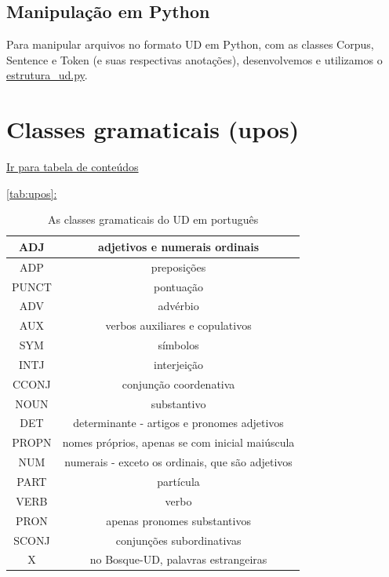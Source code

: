 \documentclass[output=paper,colorlinks,citecolor=brown]{langscibook}
\newcommand*{\fullref}[1]{\hyperref[{#1}]{\autoref*{#1}: \nameref*{#1}}} %
\begin{document}
\section{Manipulação em Python}\label{sec:python}



Para manipular arquivos no formato UD em Python, com as classes Corpus, Sentence e Token (e suas respectivas anotações), desenvolvemos e utilizamos o \href{https://github.com/alvelvis/ACDC-UD/blob/master/estrutura_ud.py}{estrutura\_ud.py}.

\chapter{Classes gramaticais (upos)}\label{sec:upos}

\hyperlink{toc}{Ir para tabela de conteúdos\\}

\fullref{tab:upos}

\begin{table}[]
    \centering
    \begin{tabular}{| c | c |}
    \hline
    ADJ & adjetivos e numerais ordinais \\
    \hline
    ADP & preposições \\
    \hline
    PUNCT & pontuação \\
    \hline
    ADV & advérbio \\
    \hline
    AUX & verbos auxiliares e copulativos \\
    \hline
    SYM & símbolos \\
    \hline
    INTJ & interjeição \\
    \hline
    CCONJ & conjunção coordenativa \\
    \hline
    NOUN & substantivo \\
    \hline
    DET & determinante - artigos e pronomes adjetivos \\
    \hline
    PROPN & nomes próprios, apenas se com inicial maiúscula \\
    \hline
    NUM & numerais - exceto os ordinais, que são adjetivos \\
    \hline
    PART & partícula \\
    \hline
    VERB & verbo \\
    \hline
    PRON & apenas pronomes substantivos \\
    \hline
    SCONJ & conjunções subordinativas \\
    \hline
    X & no Bosque-UD, palavras estrangeiras \\
    \hline
    \end{tabular}
    \caption{As classes gramaticais do UD em português}
    \label{tab:upos}
\end{table}{}
\end{document}
